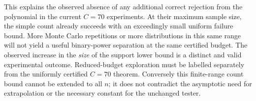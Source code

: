 \documentclass[11pt]{article}
\begin{document}
This explains the observed absence of any additional correct rejection
from the polynomial in the current $C=70$ experiments. At their maximum
sample size, the simple count already succeeds with an exceedingly small
uniform failure bound. More Monte Carlo repetitions or more distributions
in this same range will not yield a useful binary-power separation at the
same certified budget. The observed increase in the \emph{size} of the
support lower bound is a distinct and valid experimental outcome.
Reduced-budget exploration must be labelled separately from the uniformly
certified $C=70$ theorem. Conversely this finite-range count bound cannot
be extended to all $n$; it does not contradict the asymptotic need for
extrapolation or the necessary constant for the unchanged tester.
\end{document}
